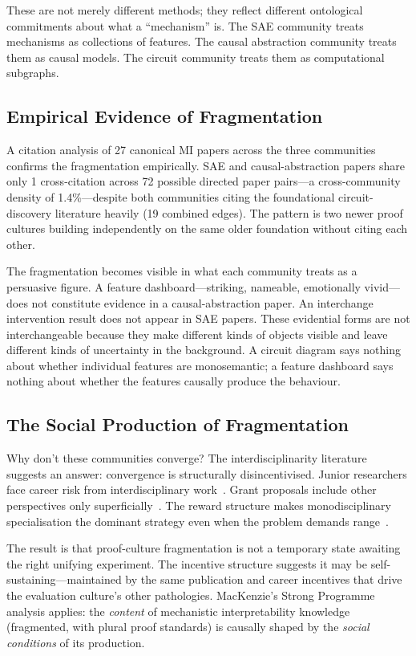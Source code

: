 \documentclass{article}
\begin{document}
These are not merely different methods; they reflect different ontological commitments about what a ``mechanism'' is. The SAE community treats mechanisms as collections of features. The causal abstraction community treats them as causal models. The circuit community treats them as computational subgraphs.

\subsection{Empirical Evidence of Fragmentation}

A citation analysis of 27 canonical MI papers across the three communities confirms the fragmentation empirically. SAE and causal-abstraction papers share only 1 cross-citation across 72 possible directed paper pairs---a cross-community density of 1.4\%---despite both communities citing the foundational circuit-discovery literature heavily (19 combined edges). The pattern is two newer proof cultures building independently on the same older foundation without citing each other.

The fragmentation becomes visible in what each community treats as a persuasive figure. A feature dashboard---striking, nameable, emotionally vivid---does not constitute evidence in a causal-abstraction paper. An interchange intervention result does not appear in SAE papers. These evidential forms are not interchangeable because they make different kinds of objects visible and leave different kinds of uncertainty in the background. A circuit diagram says nothing about whether individual features are monosemantic; a feature dashboard says nothing about whether the features causally produce the behaviour.

\subsection{The Social Production of Fragmentation}

Why don't these communities converge? The interdisciplinarity literature suggests an answer: convergence is structurally disincentivised. Junior researchers face career risk from interdisciplinary work~\citep{leahey_prominent_2017}. Grant proposals include other perspectives only superficially~\citep{klein_interdisciplinarity_2010}. The reward structure makes monodisciplinary specialisation the dominant strategy even when the problem demands range~\citep{epstein_range_2019}.

The result is that proof-culture fragmentation is not a temporary state awaiting the right unifying experiment. The incentive structure suggests it may be self-sustaining---maintained by the same publication and career incentives that drive the evaluation culture's other pathologies. MacKenzie's Strong Programme analysis applies: the \textit{content} of mechanistic interpretability knowledge (fragmented, with plural proof standards) is causally shaped by the \textit{social conditions} of its production.
\end{document}
